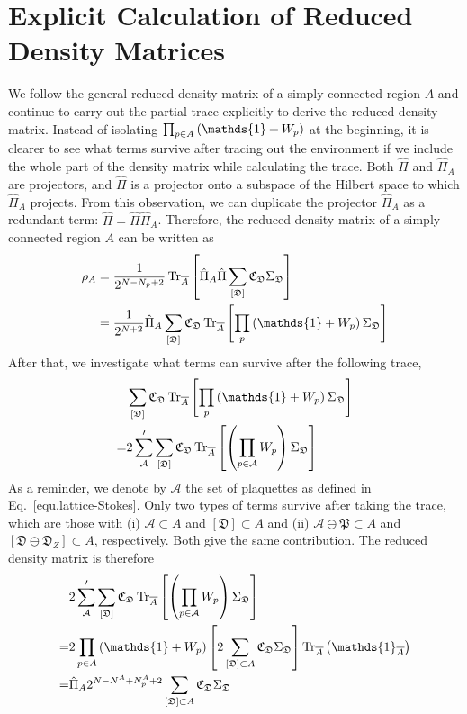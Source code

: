 \section{Explicit Calculation of Reduced Density Matrices}\label{appendix:reduced-density0matrix}
We follow the general reduced density matrix of a simply-connected region $A$ and continue to carry out the partial trace explicitly to derive the reduced density matrix. Instead of isolating $\prod_{p\in A}\lr{\mathds{1}+W_p}$ at the beginning, it is clearer to see what terms survive after tracing out the environment if we include the whole part of the density matrix while calculating the trace. Both $\hat{\Pi}$ and $\hat{\Pi}_A$ are projectors, and $\hat{\Pi}$ is a projector onto a subspace of the Hilbert space to which $\hat{\Pi}_A$ projects. From this observation, we can duplicate the projector $\hat{\Pi}_A$ as a redundant term: $\hat{\Pi} = \hat{\Pi}\hat{\Pi}_A$. Therefore, the reduced density matrix of a simply-connected region $A$ can be written as
\begin{align*}
\rho_A &= \frac{1}{2^{N-N_p+2}}\Tr_{\overline{A}}\lrm{\hat{\Pi}_A\hat{\Pi}\sum_{[\mathfrak{D}]}\mathfrak{C}_\mathfrak{D}\Sigma_\mathfrak{D}} \\
&= 
\frac{1}{2^{N+2}}\hat{\Pi}_A \sum_{[\mathfrak{D}]}\mathfrak{C}_\mathfrak{D} \Tr_{\overline{A}}\lrm{\prod_{p}\lr{\mathds{1}+W_p}\Sigma_\mathfrak{D}}
\end{align*}
After that, we investigate what terms can survive after the following trace,
\begin{align*}
    &\sum_{[\mathfrak{D}]}\mathfrak{C}_{\mathfrak{D}}\Tr_{\overline{A}}\lrm{\prod_{p}\lr{\mathds{1} + W_p}\Sigma_{\mathfrak{D}}}\\
=&
2\sum'_{\mathcal{A}}\sum_{[\mathfrak{D}]}\mathfrak{C}_{\mathfrak{D}} \Tr_{\overline{A}}\lrm{ \lr{\prod_{p\in\mathcal{A}}W_p }\Sigma_{\mathfrak{D}}}
\end{align*}
As a reminder, we denote by $\mathcal{A}$ the set of plaquettes as defined in Eq.~\eqref{equ.lattice-Stokes}. Only two types of terms survive after taking the trace, which are those with (i) $\mathcal{A}\subset A$ and $[\mathfrak{D}]\subset A$ and (ii) $\mathcal{A}\ominus\mathfrak{P}\subset A$ and $[\mathfrak{D}\ominus\mathfrak{D}_Z]\subset A$, respectively. Both give the same contribution. The reduced density matrix is therefore
\begin{align*}
&2\sum'_{\mathcal{A}}\sum_{[\mathfrak{D}]}\mathfrak{C}_{\mathfrak{D}} \Tr_{\overline{A}}\lrm{ \lr{\prod_{p\in\mathcal{A}}W_p } \Sigma_{\mathfrak{D}}} \\
=& 2\prod_{p\in A}\lr{\mathds{1}+W_p}\lrm{ 2\sum_{[\mathfrak{D}]\subset A} \mathfrak{C}_{\mathfrak{D}}\Sigma_{\mathfrak{D}} 
}
\Tr_{\overline{A}}\lr{\mathds{1}_{\overline{A}}} \\
=& \hat{\Pi}_A 2^{N-N^A+N^A_p+2} \sum_{[\mathfrak{D}]\subset A} \mathfrak{C}_{\mathfrak{D}}\Sigma_{\mathfrak{D}}
\end{align*}
